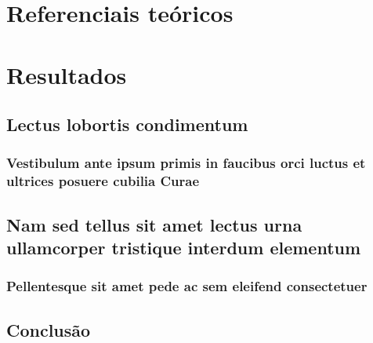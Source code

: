 \documentclass[
	12pt,				%
	openright,			%
	twoside,			%
	a4paper,			%
	english,			%
	french,				%
	spanish,			%
	brazil				%
	]{abntex2}
\begin{document}
\part{Referenciais teóricos}



\lipsum[1]

\lipsum[2-3]

\part{Resultados}

\chapter{Lectus lobortis condimentum}

\section{Vestibulum ante ipsum primis in faucibus orci luctus et ultrices
posuere cubilia Curae}

\lipsum[21-22]

\chapter{Nam sed tellus sit amet lectus urna ullamcorper tristique interdum
elementum}

\section{Pellentesque sit amet pede ac sem eleifend consectetuer}

\lipsum[24]


\chapter{Conclusão}
\end{document}
